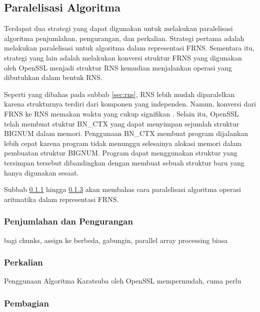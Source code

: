 \subsection{Paralelisasi Algoritma}
Terdapat dua strategi yang dapat digunakan untuk melakukan paralelisasi algoritma penjumlahan, pengurangan, dan perkalian. Strategi pertama adalah melakukan paralelisasi untuk algoritma dalam representasi FRNS. Sementara itu, strategi yang lain adalah melakukan konversi struktur FRNS yang digunakan oleh OpenSSL menjadi struktur RNS kemudian menjalankan operasi yang dibutuhkan dalam bentuk RNS.

Seperti yang dibahas pada subbab \ref{sec:rns}, RNS lebih mudah diparalelkan karena strukturnya terdiri dari komponen yang independen. Namun, konversi dari FRNS ke RNS memakan waktu yang cukup signifikan . Selain itu, OpenSSL telah membuat stuktur BN\_CTX yang dapat menyimpan sejumlah struktur BIGNUM dalam memori. Penggunaan BN\_CTX membuat program dijalankan lebih cepat karena program tidak menunggu selesainya alokasi memori dalam pembuatan struktur BIGNUM. Program dapat menggunakan struktur yang tersimpan tersebut dibandingkan dengan membuat sebuah struktur baru yang hanya digunakan sesaat.

Subbab \ref{sec:add_sub_parallel} hingga \ref{sec:div_parallel} akan membahas cara paralelisasi algoritma operasi aritmatika dalam representasi FRNS.

\subsubsection{Penjumlahan dan Pengurangan}\label{sec:add_sub_parallel}
bagi chunks, assign ke berbeda, gabungin, parallel array processing biasa


\subsubsection{Perkalian}
Penggunaan Algoritma Karatsuba oleh OpenSSL mempermudah, cuma perlu

\subsubsection{Pembagian}\label{sec:div_parallel}
